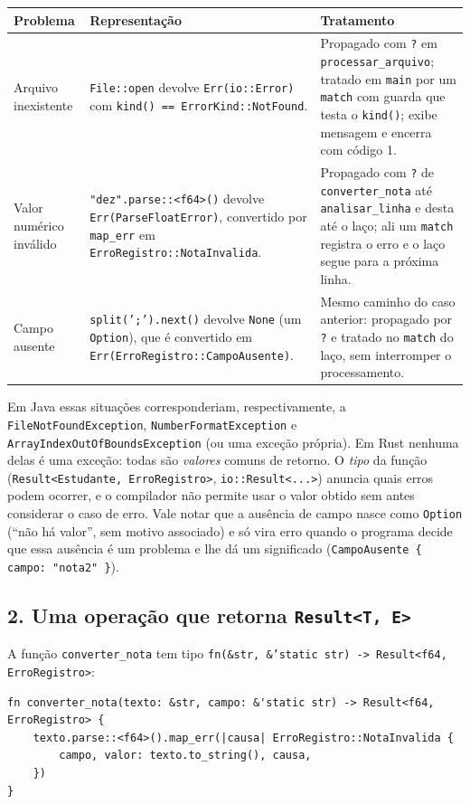 \documentclass[11pt,a4paper]{article}
\newcommand{\code}[1]{\texttt{#1}}
\begin{document}
\begin{tabularx}{\linewidth}{@{}p{2.6cm}XX@{}}
\toprule
\textbf{Problema} & \textbf{Representação} & \textbf{Tratamento} \\
\midrule
Arquivo inexistente &
\code{File::open} devolve \code{Err(io::Error)} com
\code{kind() == ErrorKind::NotFound}. &
Propagado com \code{?} em \code{processar\_arquivo}; tratado em \code{main}
por um \code{match} com guarda que testa o \code{kind()}; exibe mensagem e
encerra com código 1. \\
\addlinespace
Valor numérico inválido &
\code{"dez".parse::<f64>()} devolve \code{Err(ParseFloatError)}, convertido
por \code{map\_err} em \code{ErroRegistro::NotaInvalida}. &
Propagado com \code{?} de \code{converter\_nota} até \code{analisar\_linha} e
desta até o laço; ali um \code{match} registra o erro e o laço segue para a
próxima linha. \\
\addlinespace
Campo ausente &
\code{split(';').next()} devolve \code{None} (um \code{Option}), que é
convertido em \code{Err(ErroRegistro::CampoAusente)}. &
Mesmo caminho do caso anterior: propagado por \code{?} e tratado no
\code{match} do laço, sem interromper o processamento. \\
\bottomrule
\end{tabularx}

Em Java essas situações corresponderiam, respectivamente, a
\code{FileNotFoundException}, \code{NumberFormatException} e
\code{ArrayIndexOutOfBoundsException} (ou uma exceção própria). Em Rust
nenhuma delas é uma exceção: todas são \emph{valores} comuns de retorno.
O \emph{tipo} da função (\code{Result<Estudante, ErroRegistro>},
\code{io::Result<...>}) anuncia quais erros podem ocorrer, e o compilador não
permite usar o valor obtido sem antes considerar o caso de erro. Vale notar que a ausência de campo
nasce como \code{Option} (``não há valor'', sem motivo associado) e só
vira erro quando o programa decide que essa ausência é um problema e lhe
dá um significado (\code{CampoAusente \{ campo: "nota2" \}}).

\subsection*{2. Uma operação que retorna \code{Result<T, E>}}

A função \code{converter\_nota} tem tipo
\code{fn(\&str, \&'static str) -> Result<f64, ErroRegistro>}:

\begin{lstlisting}[numbers=none]
fn converter_nota(texto: &str, campo: &'static str) -> Result<f64, ErroRegistro> {
    texto.parse::<f64>().map_err(|causa| ErroRegistro::NotaInvalida {
        campo, valor: texto.to_string(), causa,
    })
}
\end{lstlisting}
\end{document}
